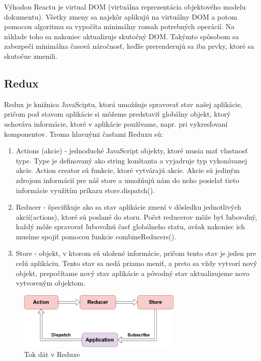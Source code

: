 Výhodou Reactu je virtual DOM (virtuálna reprezentácia objektového modelu dokumentu). Všetky zmeny sa najskôr aplikujú na virtuálny DOM a potom pomocou algoritmu sa vypočíta minimálny rozsah potrebných operácií. Na základe toho sa nakoniec aktualizuje skutočný DOM. Takýmto spôsobom sa zabezpečí minimálna časová náročnosť, keďže prerenderujú sa iba prvky, ktoré sa skutočne zmenili.

\subsection{Redux}
Redux {\cite{redux}} je knižnica JavaSciptu, ktorá umožňuje spravovať stav našej aplikácie, pričom pod stavom aplikácie si môžeme predstaviť globálny objekt, ktorý uchováva informácie, ktoré v aplikácie používame, napr. pri vykresľovaní komponentov. 
Troma hlavnými časťami Reduxu sú:
\begin{enumerate}
\item Actions (akcie) - jednoduché JavaScript objekty, ktoré musia mať vlastnosť type. Type je definovaný ako string konštanta a vyjadruje typ vykonávanej akcie. Action creator sú funkcie, ktoré vytvárajú akcie. Akcie sú jediným zdrojom informácií pre náš store a umožňujú nám do neho posielať tieto informácie využitím príkazu store.dispatch().
\item Reducer - špecifikuje ako sa stav aplikácie zmení v dôsledku jednotlivých akcií(actions), ktoré sú poslané do storu. Počet reducerov môže byť ľubovoľný, každý môže spravovať ľubovoľnú časť globálneho statu, avšak nakoniec ich musíme spojiť pomocou funkcie combineReducers().
\item Store - objekt, v ktorom sú uložené informácie, pričom tento stav je jeden pre celú aplikáciu. Tento stav sa nedá priamo meniť, a preto sa vždy vytvorí nový objekt, prepočítame nový stav aplikácie a pôvodný stav aktualizujeme novo vytvoreným objektom.
\end{enumerate}

\begin{figure}[h]
\centering
\includegraphics[width=0.7\textwidth]{images/reduxDataFlow}
\caption{Tok dát v Reduxe}
\label{reduxFlow}
\end{figure}


